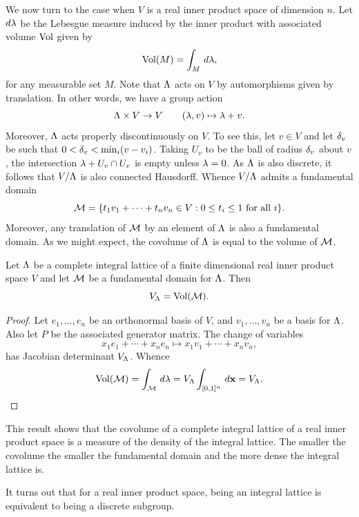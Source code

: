     We now turn to the case when \(V\) is a real inner product space of dimension \(n\). Let \(d\lambda\) be the Lebesgue measure induced by the inner product with associated volume \(\operatorname{\mathrm{Vol}}\) given by
    \[
      \operatorname{\mathrm{Vol}}(M) = \int_{M}\,d\lambda,
    \]
    for any measurable set \(M\). Note that \(\Lambda\) acts on \(V\) by automorphisms given by translation. In other words, we have a group action
    \[
      \Lambda \times V \to V \qquad (\lambda,v) \mapsto \lambda+v.
    \]
    Moreover, \(\Lambda\) acts properly discontinuously on \(V\). To see this, let \(v \in V\) and let \(\delta_{v}\) be such that \(0 < \delta_{v} < \min_{i}(v-v_{i})\). Taking \(U_{v}\) to be the ball of radius \(\delta_{v}\) about \(v\), the intersection \(\lambda+U_{v} \cap U_{v}\) is empty unless \(\lambda = 0\). As \(\Lambda\) is also discrete, it follows that \(V/\Lambda\) is also connected Hausdorff. Whence \(V/\Lambda\) admits a fundamental domain
    \[
      \mathcal{M} = \{t_{1}v_{1}+\cdots+t_{n}v_{n} \in V:0 \le t_{i} \le 1 \text{ for all } i\}.
    \]
    Moreover, any translation of \(\mathcal{M}\) by an element of \(\Lambda\) is also a fundamental domain. As we might expect, the covolume of \(\Lambda\) is equal to the volume of \(\mathcal{M}\).

    \begin{proposition}\label{prop:covolume_equals_volume_of_fundamental_domain}
      Let \(\Lambda\) be a complete integral lattice of a finite dimensional real inner product space \(V\) and let \(\mathcal{M}\) be a fundamental domain for \(\Lambda\). Then
      \[
        V_{\Lambda} = \operatorname{\mathrm{Vol}}(\mathcal{M}).
      \]
    \end{proposition}
    \begin{proof}
      Let \(e_{1},\ldots,e_{n}\) be an orthonormal basis of \(V\), and \(v_{1},\ldots,v_{n}\) be a basis for \(\Lambda\). Also let \(P\) be the associated generator matrix. The change of variables
      \[
        x_{1}e_{1}+\cdots+x_{n}e_{n} \mapsto x_{1}v_{1}+\cdots+x_{n}v_{n},
      \]
      has Jacobian determinant \(V_{\Lambda}\). Whence
      \[
        \operatorname{\mathrm{Vol}}(\mathcal{M}) = \int_{\mathcal{M}}\,d\lambda = V_{\Lambda}\int_{[0,1]^{n}}\,d\mathbf{x} = V_{\Lambda}.
      \]
    \end{proof}

    This result shows that the covolume of a complete integral lattice of a real inner product space is a measure of the density of the integral lattice. The smaller the covolume the smaller the fundamental domain and the more dense the integral lattice is.
    
    It turns out that for a real inner product space, being an integral lattice is equivalent to being a discrete subgroup.

